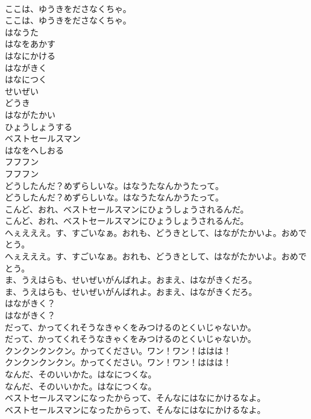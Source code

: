 \documentclass[8pt]{extreport}
\begin{document}
\begin{CJK}{UTF8}{min}
\\	ここは、ゆうきをださなくちゃ。	
\\	ここは、ゆうきをださなくちゃ。 
\\	はなうた
\\	はなをあかす
\\	はなにかける
\\	はながきく
\\	はなにつく
\\	せいぜい
\\	どうき
\\	はながたかい
\\	ひょうしょうする
\\	ベストセールスマン
\\	はなをへしおる
\\	フフフン	
\\	フフフン 
\\	どうしたんだ？めずらしいな。はなうたなんかうたって。	
\\	どうしたんだ？めずらしいな。はなうたなんかうたって。 
\\	こんど、おれ、ベストセールスマンにひょうしょうされるんだ。	
\\	こんど、おれ、ベストセールスマンにひょうしょうされるんだ。 
\\	へぇえええ。す、すごいなぁ。おれも、どうきとして、はながたかいよ。おめでとう。	
\\	へぇえええ。す、すごいなぁ。おれも、どうきとして、はながたかいよ。おめでとう。 
\\	ま、うえはらも、せいぜいがんばれよ。おまえ、はながきくだろ。	
\\	ま、うえはらも、せいぜいがんばれよ。おまえ、はながきくだろ。 
\\	はながきく？	
\\	はながきく？ 
\\	だって、かってくれそうなきゃくをみつけるのとくいじゃないか。	
\\	だって、かってくれそうなきゃくをみつけるのとくいじゃないか。 
\\	クンクンクンクン。かってください。ワン！ワン！ははは！	
\\	クンクンクンクン。かってください。ワン！ワン！ははは！ 
\\	なんだ、そのいいかた。はなにつくな。	
\\	なんだ、そのいいかた。はなにつくな。 
\\	ベストセールスマンになったからって、そんなにはなにかけるなよ。	
\\	ベストセールスマンになったからって、そんなにはなにかけるなよ。 

\end{CJK}
\end{document}
